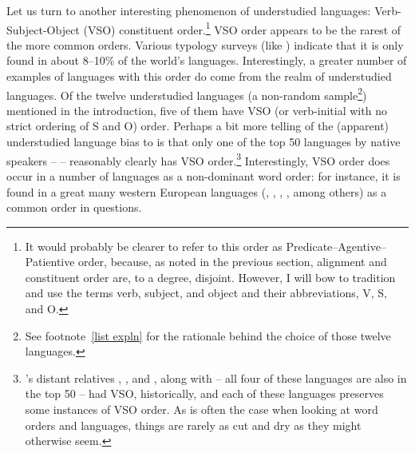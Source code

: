 \documentclass[output=paper
 	        ,biblatex
                ,babelshorthands
                ,newtxmath
                ,draftmode
                ,colorlinks, citecolor=brown
]{langscibook}
\begin{document}
Let us turn to another interesting phenomenon of understudied languages: Verb-Subject-Object (VSO) constituent order.\footnote{It would probably be clearer to refer to this order as Predicate--Agentive--Patientive order, because, as noted in the previous section, alignment and constituent order are, to a degree, disjoint. However, I will bow to tradition and use the terms verb, subject, and object and their abbreviations, V, S, and O.} VSO order appears to be the rarest of the more common orders. Various typology surveys (like \citealt{dryerWALSwordorder}) indicate that it is only found in about 8--10\% of the world's languages. Interestingly, a greater number of examples of languages with this order do come from the realm of understudied languages. Of the twelve understudied languages (a non-random sample\footnote{See footnote~\ref{list expln} for the rationale behind the choice of those twelve languages.}) mentioned in the introduction, five of them have VSO (or verb-initial with no strict ordering of S and O) order. Perhaps a bit more telling of the (apparent) understudied language bias to  is that only one of the top 50 languages by native speakers --  -- reasonably clearly has VSO order.\footnote{'s distant  relatives , , and , along with  -- all four of these languages are also in the top 50 -- had VSO, historically, and each of these languages preserves some instances of VSO order. As is often the case when looking at word orders and languages, things are rarely as cut and dry as they might otherwise seem.} Interestingly, VSO order does occur in a number of languages as a non-dominant word order: for instance, it is found in a great many western European languages (, , , , among others) as a common order in questions.
\end{document}
